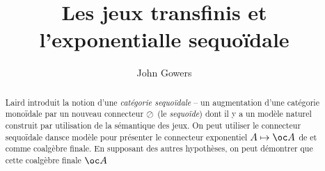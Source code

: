 \documentclass[11pt]{article}
\title{Les jeux transfinis et l'exponentialle sequo\"{i}dale}
\author{John Gowers}
\begin{document}
\maketitle

\begin{abstract}
  Laird \cite{laird02} introduit la notion d'une \emph{cat\'{e}gorie sequo\"{i}dale} -- un augmentation d'une cat\'{e}gorie mono\"{i}dale par un nouveau connecteur $\oslash$ (le \emph{sequo\"{i}de}) dont il y a un mod\`{e}le naturel construit par utilisation de la s\'{e}mantique des jeux.  On peut utiliser le connecteur sequo\"{i}dale dansce mod\`{e}le pour pr\'{e}senter le connecteur exponentiel $A\mapsto\oc A$ de \cite{hyland1997games} et \cite{ajmPcf} comme coalg\`{e}bre finale.  En supposant des autres hypoth\`{e}ses, on peut d\'{e}montrer que cette coalg\`{e}bre finale $\oc A$
\end{abstract}



\end{document}
